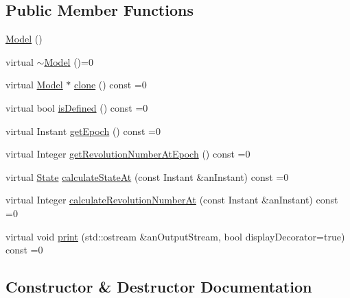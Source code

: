 \subsection*{Public Member Functions}
\begin{DoxyCompactItemize}
\item 
\hyperlink{classlibrary_1_1astro_1_1trajectory_1_1orbit_1_1_model_abcd99755e4229e41638ce373a0e6763c}{Model} ()
\item 
virtual \hyperlink{classlibrary_1_1astro_1_1trajectory_1_1orbit_1_1_model_a1d580725a826a6d16d2c3d4cf2022a50}{$\sim$\+Model} ()=0
\item 
virtual \hyperlink{classlibrary_1_1astro_1_1trajectory_1_1orbit_1_1_model}{Model} $\ast$ \hyperlink{classlibrary_1_1astro_1_1trajectory_1_1orbit_1_1_model_a45d75e4d212a9bb01aa596eaeeae43ae}{clone} () const =0
\item 
virtual bool \hyperlink{classlibrary_1_1astro_1_1trajectory_1_1orbit_1_1_model_a518785603421d259e427bd0a6ee5e787}{is\+Defined} () const =0
\item 
virtual Instant \hyperlink{classlibrary_1_1astro_1_1trajectory_1_1orbit_1_1_model_acdec7ed6eed001c2ab4ac5442699a316}{get\+Epoch} () const =0
\item 
virtual Integer \hyperlink{classlibrary_1_1astro_1_1trajectory_1_1orbit_1_1_model_a940f5e266feb90ee8264d4c7a8a883f3}{get\+Revolution\+Number\+At\+Epoch} () const =0
\item 
virtual \hyperlink{classlibrary_1_1astro_1_1trajectory_1_1_state}{State} \hyperlink{classlibrary_1_1astro_1_1trajectory_1_1orbit_1_1_model_a34198a504836b9779425da99d964d19c}{calculate\+State\+At} (const Instant \&an\+Instant) const =0
\item 
virtual Integer \hyperlink{classlibrary_1_1astro_1_1trajectory_1_1orbit_1_1_model_a6329db5556ed72aa8ad18515aeaefeab}{calculate\+Revolution\+Number\+At} (const Instant \&an\+Instant) const =0
\item 
virtual void \hyperlink{classlibrary_1_1astro_1_1trajectory_1_1orbit_1_1_model_abd4fb7604274cc8b3589a445db64e98c}{print} (std\+::ostream \&an\+Output\+Stream, bool display\+Decorator=true) const =0
\end{DoxyCompactItemize}


\subsection{Constructor \& Destructor Documentation}
\mbox{\label{classlibrary_1_1astro_1_1trajectory_1_1orbit_1_1_model_abcd99755e4229e41638ce373a0e6763c}} 
